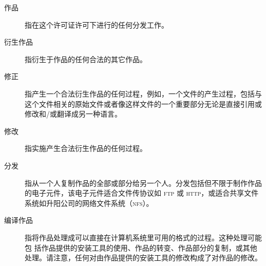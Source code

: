 \begin{LPPLicense}
    \begin{description}
        \item[作品] 指在这个许可证许可下进行的任何分发工作。
        \item[衍生作品] 指衍生于作品的任何合法的其它作品。
        \item[修正] 指产生一个合法衍生作品的任何过程，例如，一个文件的产生过程，包括与这个文件相关的原始文件或者像这样文件的一个重要部分无论是直接引用或修改和/或翻译成另一种语言。
        \item[修改] 指实施产生合法衍生作品的任何过程。
        \item[分发] 指从一个人复制作品的全部或部分给另一个人。分发包括但不限于制作作品的电子元件，该电子元件适合文件传协议如 \textsc{ftp} 或 \textsc{http}，或适合共享文件系统如升阳公司的网络文件系统（\textsc{nfs}）。
        \item[编译作品] 指将作品处理成可以直接在计算机系统里可用的格式的过程。这种处理可能包 括作品提供的安装工具的使用、作品的转变、作品部分的复制，或其他处理。请注意，任何对由作品提供的安装工具的修改构成了对作品的修改。

\end{description}
\end{LPPLicense}

